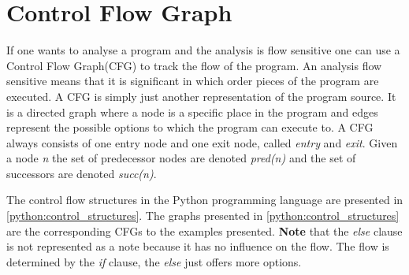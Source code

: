 \section{Control Flow Graph}\label{control_flow_graph}
If one wants to analyse a program and the analysis is flow sensitive one can use a Control Flow Graph(CFG) to track the flow of the program.
An analysis flow sensitive means that it is significant in which order pieces of the program are executed.
A CFG is simply just another representation of the program source.
It is a directed graph where a node is a specific place in the program and edges represent the possible options to which the program can execute to.
A CFG always consists of one entry node and one exit node, called \textit{entry} and \textit{exit}.
Given a node \textit{n} the set of predecessor nodes are denoted \textit{pred(n)} and the set of successors are denoted \textit{succ(n)}.

The control flow structures in the Python programming language are presented in \cref{python:control_structures}.
The graphs presented in \cref{python:control_structures} are the corresponding CFGs to the examples presented.
\textbf{Note} that the \textit{else} clause is not represented as a note because it has no influence on the flow.
The flow is determined by the \textit{if} clause, the \textit{else} just offers more options.
